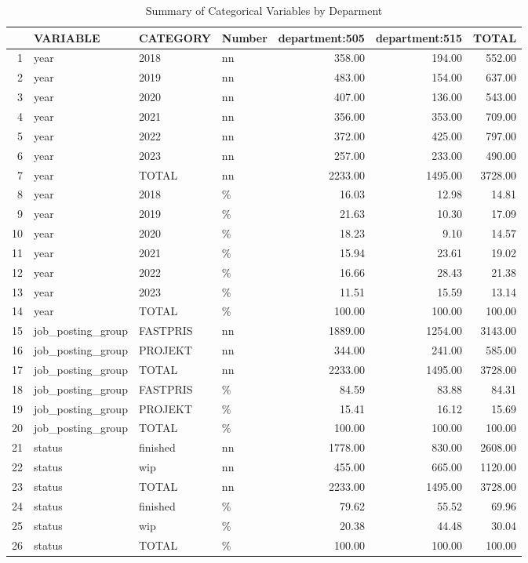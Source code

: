 \begin{sidewaystable}[ht]
\centering
\caption{Summary of Categorical Variables by Deparment} 
\begin{tabular}{rlllrrr}
  \hline
 & VARIABLE & CATEGORY & Number & department:505 & department:515 & TOTAL \\ 
  \hline
1 & year & 2018 & nn & 358.00 & 194.00 & 552.00 \\ 
  2 & year & 2019 & nn & 483.00 & 154.00 & 637.00 \\ 
  3 & year & 2020 & nn & 407.00 & 136.00 & 543.00 \\ 
  4 & year & 2021 & nn & 356.00 & 353.00 & 709.00 \\ 
  5 & year & 2022 & nn & 372.00 & 425.00 & 797.00 \\ 
  6 & year & 2023 & nn & 257.00 & 233.00 & 490.00 \\ 
  7 & year & TOTAL & nn & 2233.00 & 1495.00 & 3728.00 \\ 
  8 & year & 2018 & \% & 16.03 & 12.98 & 14.81 \\ 
  9 & year & 2019 & \% & 21.63 & 10.30 & 17.09 \\ 
  10 & year & 2020 & \% & 18.23 & 9.10 & 14.57 \\ 
  11 & year & 2021 & \% & 15.94 & 23.61 & 19.02 \\ 
  12 & year & 2022 & \% & 16.66 & 28.43 & 21.38 \\ 
  13 & year & 2023 & \% & 11.51 & 15.59 & 13.14 \\ 
  14 & year & TOTAL & \% & 100.00 & 100.00 & 100.00 \\ 
  15 & job\_posting\_group & FASTPRIS & nn & 1889.00 & 1254.00 & 3143.00 \\ 
  16 & job\_posting\_group & PROJEKT & nn & 344.00 & 241.00 & 585.00 \\ 
  17 & job\_posting\_group & TOTAL & nn & 2233.00 & 1495.00 & 3728.00 \\ 
  18 & job\_posting\_group & FASTPRIS & \% & 84.59 & 83.88 & 84.31 \\ 
  19 & job\_posting\_group & PROJEKT & \% & 15.41 & 16.12 & 15.69 \\ 
  20 & job\_posting\_group & TOTAL & \% & 100.00 & 100.00 & 100.00 \\ 
  21 & status & finished & nn & 1778.00 & 830.00 & 2608.00 \\ 
  22 & status & wip & nn & 455.00 & 665.00 & 1120.00 \\ 
  23 & status & TOTAL & nn & 2233.00 & 1495.00 & 3728.00 \\ 
  24 & status & finished & \% & 79.62 & 55.52 & 69.96 \\ 
  25 & status & wip & \% & 20.38 & 44.48 & 30.04 \\ 
  26 & status & TOTAL & \% & 100.00 & 100.00 & 100.00 \\ 
   \hline
\end{tabular}
\end{sidewaystable}
